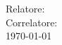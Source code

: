 \newpage 
\pagestyle{empty}
\begin{center}
\Large\textbf{\fontsize{30}{30}\selectfont{\\ \vspace{170pt} \ttitle}}\\
\vspace{30pt}
\textbf{\candidatename}\\
Relatore: \textbf{\fstsupname}\\
Correlatore: \textbf{\sndsupname}\\
\vspace{10cm}
\today
\end{center}
\clearpage

\restoregeometry
